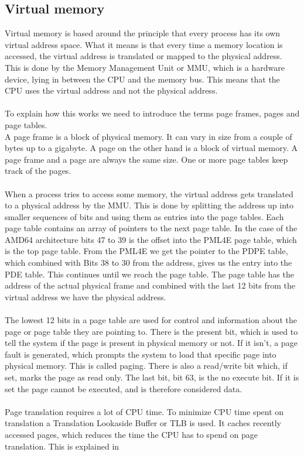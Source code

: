 \subsection{Virtual memory}
Virtual memory is based around the principle that every process has its own virtual address space. What it means is that every time a memory location is accessed, the virtual address is translated or mapped to the physical address. This is done by the Memory Management Unit or MMU, which is a hardware device, lying in between the CPU and the memory bus. This means that the CPU uses the virtual address and not the physical address.\\\\
To explain how this works we need to introduce the terms page frames, pages and page tables. \\
A page frame is a block of physical memory. It can vary in size from a couple of bytes up to a gigabyte. A page on the other hand is a block of virtual memory. A page frame and a page are always the same size. One or more page tables keep track of the pages. \\\\
When a process tries to access some memory, the virtual address gets translated to a physical address by the MMU. This is done by splitting the address up into smaller sequences of bits and using them as entries into the page tables. Each page table contains an array of pointers to the next page table. In the case of the AMD64 architecture bits 47 to 39 is the offset into the PML4E page table, which is the top page table. From the PML4E we get the pointer to the PDPE table, which combined with Bits 38 to 30 from the address, gives us the entry into the PDE table. This continues until we reach the page table. The page table has the address of the actual physical frame and combined with the last 12 bits from the virtual address we have the physical address.\\\\
The lowest 12 bits in a page table are used for control and information about the page or page table they are pointing to. There is the present bit, which is used to tell the system if the page is present in physical memory or not. If it isn't, a page fault is generated, which prompts the system to load that specific page into physical memory. This is called paging. There is also a read/write bit which, if set, marks the page as read only. The last bit, bit 63, is the no execute bit. If it is set the page cannot be executed, and is therefore considered data.\\\\
Page translation requires a lot of CPU time. To minimize CPU time spent on translation a Translation Lookaside Buffer or TLB is used. It caches recently accessed pages, which reduces the time the CPU has to spend on page translation. This is explained in \cite{AMD64Manual} \\\\

